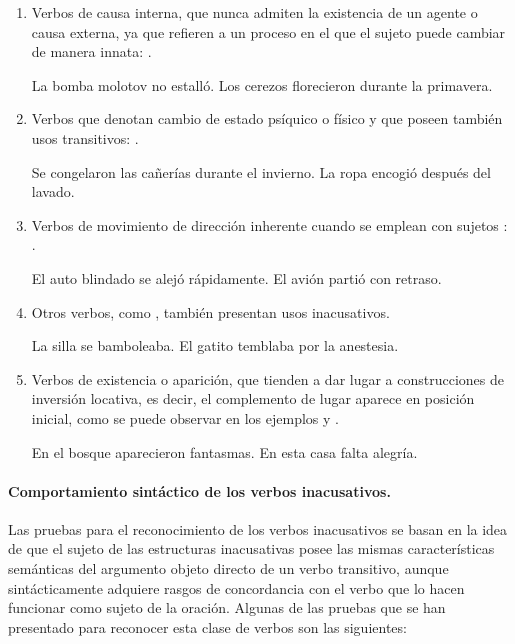 \begin{enumerate}[label=\alph*)]
  \item Verbos de causa interna, que nunca admiten la existencia de un agente o
        causa externa, ya que refieren a un proceso en el que el sujeto puede
        cambiar de manera innata: .
        \begin{exe}
          \ex La bomba molotov no estalló.
          \ex Los cerezos florecieron durante la primavera.
        \end{exe}
  \item Verbos que denotan cambio de estado psíquico o físico y que poseen
        también usos transitivos: .
        \begin{exe}
          \ex Se congelaron las cañerías durante el invierno.
          \ex La ropa encogió después del lavado.
        \end{exe}
  \item Verbos de movimiento de dirección inherente cuando se emplean con
        sujetos : .
        \begin{exe}
          \ex El auto blindado se alejó rápidamente.
          \ex El avión partió con retraso.
        \end{exe}
  \item Otros verbos, como , también
        presentan usos inacusativos.
        \begin{exe}
          \ex La silla se bamboleaba.
          \ex El gatito temblaba por la anestesia.
        \end{exe}
  \item Verbos de existencia o aparición, que tienden a dar lugar a
        construcciones de inversión locativa, es decir, el complemento de lugar
        aparece en posición inicial, como se puede observar en los ejemplos
         y .
        \begin{exe}
          \ex\label{ex:07-bosque} En el bosque aparecieron fantasmas.
          \ex\label{ex:07-alegria} En esta casa falta alegría.
        \end{exe}
\end{enumerate}

\paragraph{Comportamiento sintáctico de los verbos inacusativos.} Las pruebas
para el reconocimiento de los verbos inacusativos se basan en la idea de que el
sujeto de las estructuras inacusativas posee las mismas características
semánticas del argumento objeto directo de un verbo transitivo, aunque
sintácticamente adquiere rasgos de concordancia con el verbo que lo hacen
funcionar como sujeto de la oración. Algunas de las pruebas que se han
presentado para reconocer esta clase de verbos son las siguientes:

